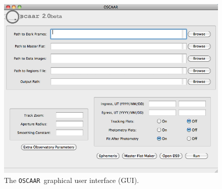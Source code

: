 \documentclass[a4paper]{article}
\newcommand{\code}[1]{\texttt{#1}}
\newcommand{\oscaar}{\code{OSCAAR}~}
\begin{document}
\begin{figure}[H]
\begin{center}
\includegraphics[scale=0.35]{imgs/GUI.png}
\caption{The \oscaar graphical user interface (GUI).}
\label{fig:gui}
\end{center}	
\end{figure}
\end{document}
